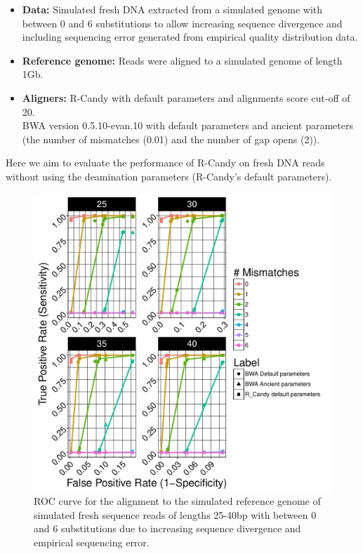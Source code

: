 \documentclass[11pt,a4paper]{report}
\begin{document}
  \begin{itemize}

   \item \textbf{Data:} Simulated fresh DNA extracted from a simulated genome 
   with between 0 and 6 substitutions to allow increasing sequence divergence
   and including sequencing error generated from empirical quality distribution data.
 
   
   \item \textbf{Reference genome:} Reads were aligned to a simulated genome of 
length 1Gb.

    \item \textbf{Aligners:} 
R-Candy with default parameters and alignments score cut-off of 20. \\
BWA version 0.5.10-evan.10 with default parameters and ancient parameters 
\cite{green2010draft} (the number of mismatches 
(0.01) and the number of gap opens (2)).

  \end{itemize}
 
Here we aim to evaluate the performance of R-Candy on fresh DNA reads 
without using the deamination parameters (R-Candy's default parameters).

\begin{figure}[H]
\centering
\includegraphics[width=12cm]{pictures/ROC_DS3_emp.pdf}

\caption{
ROC curve for the alignment to the simulated reference genome of simulated fresh 
sequence reads of lengths 25-40bp with between 0 and 6 substitutions due 
to increasing sequence divergence and empirical sequencing error.}

\label{DS3_emp}
\end{figure}
\end{document}
